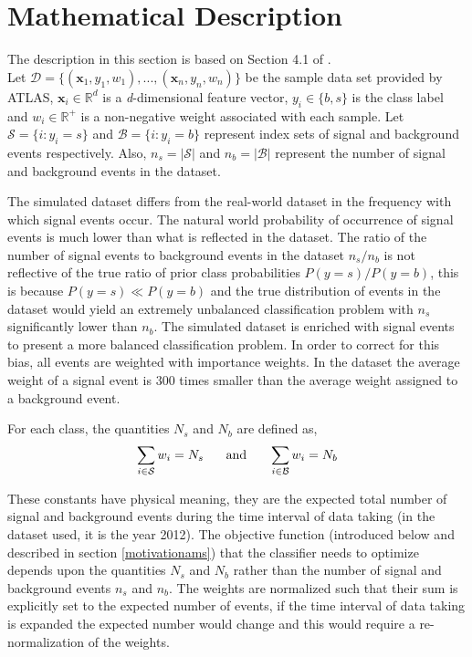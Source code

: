 \section{Mathematical Description}

\label{math}

The description in this section is based on Section 4.1 of \cite{rm}.\\

Let $\mathcal{D} = \{(\mathbf{x}_{1},y_{1},w_{1}),...,(\mathbf{x}_{n},y_{n},w_{n})\}$ be the sample data set provided by ATLAS, $\mathbf{x}_{i} \in \mathbb{R}^d$ is a \textit{d}-dimensional feature vector, $y_{i} \in \{b,s\}$ is the class label and $w_{i} \in \mathbb{R}^{+}$ is a non-negative weight associated with each sample. Let $\mathcal{S} = \{i : y_{i} = s\}$ and $\mathcal{B} = \{i : y_{i} = b\}$ represent index sets of signal and background events respectively. Also, $n_{s} = |\mathcal{S}|$ and $n_{b} = |\mathcal{B}|$ represent the number of signal and background events in the dataset. 

The simulated dataset differs from the real-world dataset in the frequency with which signal events occur. The natural world probability of occurrence of signal events is much lower than what is reflected in the dataset. The ratio of the number of signal events to background events in the dataset $n_{s}/n_{b}$ is not reflective of the true ratio of prior class probabilities $P(y = s)/P(y = b)$, this is because $P(y = s) \ll P(y = b)$ and the true distribution of events in the dataset would yield an extremely unbalanced classification problem with $n_{s}$ significantly lower than $n_{b}$.  The simulated dataset is enriched with signal events to present a more balanced classification problem. In order to correct for this bias, all events are weighted with importance weights. In the dataset the average weight of a signal event is 300 times smaller than the average weight assigned to a background event. 

For each class, the quantities $N_{s}$ and $N_{b}$ are defined as, 
\begin{equation}
\sum_{i \in \mathcal{S}} w_{i} = N_{s} \hspace{5mm} 
\textrm{ and } \hspace{5mm} 
\sum_{i \in \mathcal{B}} w_{i} = N_{b} 
\label{weights}
\end{equation}

These constants have physical meaning, they are the expected total number of signal and background events during the time interval of data taking (in the dataset used, it is the year 2012). The objective function (introduced below and described in section \ref{motivationams}) that the classifier needs to optimize depends upon the quantities $N_s$ and $N_b$ rather than the number of signal and background events $n_s$ and $n_b$. The weights are normalized such that their sum is explicitly set to the expected number of events, if the time interval of data taking is expanded the expected number would change and this would require a re-normalization of the weights.  

